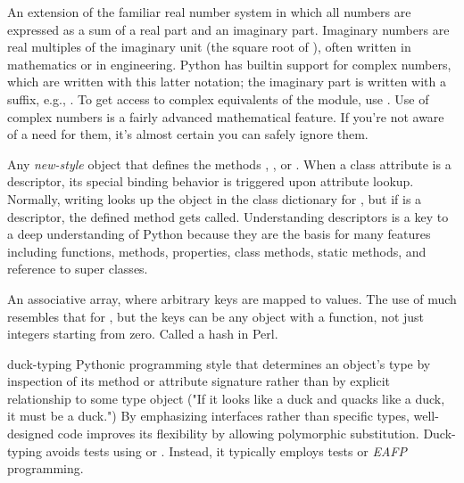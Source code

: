 \begin{description}
\item[complex number]

An extension of the familiar real number system in which all numbers are
expressed as a sum of a real part and an imaginary part.  Imaginary numbers
are real multiples of the imaginary unit (the square root of {}),
often written {} in mathematics or {} in engineering.
Python has builtin support for complex numbers, which are written with this
latter notation; the imaginary part is written with a {} suffix,
e.g., {}.  To get access to complex equivalents of the
{} module, use {}.  Use of complex numbers is a
fairly advanced mathematical feature.  If you're not aware of a need for them,
it's almost certain you can safely ignore them.

\item[descriptor]
Any \emph{new-style} object that defines the methods
{}, , or .
When a class attribute is a descriptor, its special binding behavior
is triggered upon attribute lookup.  Normally, writing  looks
up the object  in the class dictionary for , but if
{} is a descriptor, the defined method gets called.
Understanding descriptors is a key to a deep understanding of Python
because they are the basis for many features including functions,
methods, properties, class methods, static methods, and reference to
super classes.

\item[dictionary]
An associative array, where arbitrary keys are mapped to values.  The
use of  much resembles that for , but the keys
can be any object with a  function, not just
integers starting from zero.  Called a hash in Perl.

\item{duck-typing}
Pythonic programming style that determines an object's type by inspection
of its method or attribute signature rather than by explicit relationship
to some type object ("If it looks like a duck and quacks like a duck, it
must be a duck.")  By emphasizing interfaces rather than specific types,
well-designed code improves its flexibility by allowing polymorphic
substitution.  Duck-typing avoids tests using  or
. Instead, it typically employs
 tests or {}\emph{EAFP} programming.


\end{description}
